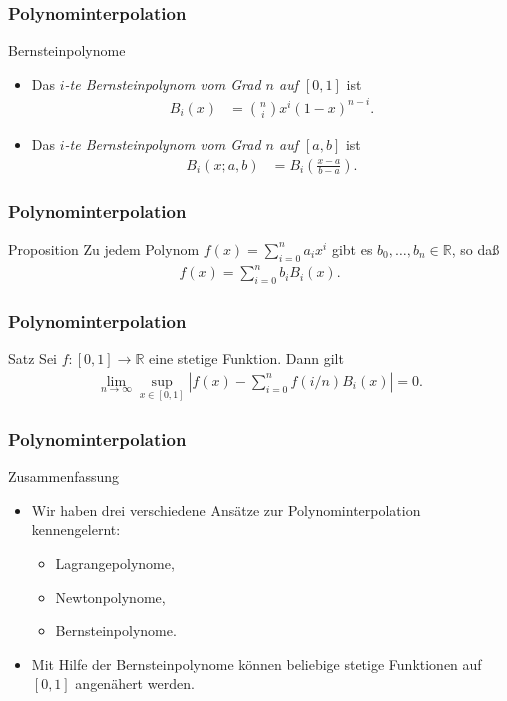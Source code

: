 \documentclass{beamer}
\renewcommand{\emph}[1]{{\textcolor{solarizedRed}{\itshape #1}}}
\newcommand\RR{\mathbb R}
\newcommand{\abs}[1]{\left|#1\right|}
\newcommand\bc[1]{\left({#1}\right)}
\newcommand\bcfr[2]{\bc{\frac{#1}{#2}}}
\renewcommand{\ae}{\"a}
\renewcommand{\oe}{\"o}
\newcommand{\mytitle}{Polynominterpolation}
\begin{document}
\begin{frame}\frametitle{\mytitle}
	\begin{block}{Bernsteinpolynome}
		\begin{itemize}
			\item Das \emph{$i$-te Bernsteinpolynom vom Grad $n$ auf $[0,1]$} ist 
				\begin{align*}
					B_{i}(x)&=\binom ni x^i(1-x)^{n-i}.
				\end{align*}
			\item Das \emph{$i$-te Bernsteinpolynom vom Grad $n$ auf $[a,b]$} ist 
				\begin{align*}
					B_i(x;a,b)&=B_i\bcfr{x-a}{b-a}.
				\end{align*}
		\end{itemize}
	\end{block}
\end{frame}

\begin{frame}\frametitle{\mytitle}
	\begin{block}{Proposition}
			Zu jedem Polynom $f(x)=\sum_{i=0}^na_ix^i$ gibt es $b_0,\ldots,b_n\in\RR$, so da\ss
			\begin{align*}
				f(x)=\sum_{i=0}^nb_iB_i(x).
			\end{align*}
	\end{block}
\end{frame}

\begin{frame}\frametitle{\mytitle}
	\begin{block}{Satz}
		Sei $f:[0,1]\to\RR$ eine stetige Funktion.
		Dann gilt
		\begin{align*}
			\lim_{n\to\infty}\sup_{x\in[0,1]}\abs{f(x)-\sum_{i=0}^nf(i/n)B_i(x)}=0.
		\end{align*}
	\end{block}
\end{frame}

\begin{frame}\frametitle{\mytitle}
	\begin{block}{Zusammenfassung}
		\begin{itemize}
			\item Wir haben drei verschiedene Ans\ae tze zur Polynominterpolation kennengelernt:
				\begin{itemize}
					\item Lagrangepolynome,
					\item Newtonpolynome,
					\item Bernsteinpolynome.
				\end{itemize}
			\item Mit Hilfe der Bernsteinpolynome k\oe nnen beliebige stetige Funktionen auf $[0,1]$ angen\ae hert werden.
		\end{itemize}
	\end{block}
\end{frame}
\end{document}
